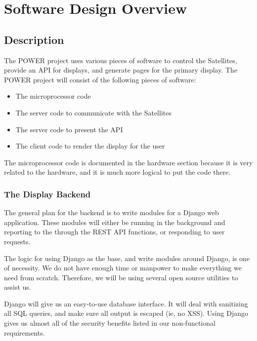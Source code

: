 
\chapter{Software Design Overview}

\section{Description}

The POWER project uses various pieces of software to control the Satellites, provide an API for displays, and generate pages for the primary display. The POWER project will consist of the following pieces of software:
\begin{itemize}
 \item The microprocessor code
 \item The server code to communicate with the Satellites
 \item The server code to present the API
 \item The client code to render the display for the user
\end{itemize}

The microprocessor code is documented in the hardware section because it is very related to the hardware, and it is much more logical to put the  code there.

\subsection{The Display Backend}

The general plan for the backend is to write modules for a Django web application. These modules will either be running in the background and reporting to the through the REST API functions, or responding to user requests.

The logic for using Django as the base, and write modules around Django, is one of necessity. We do not have enough time or manpower to make everything we need from scratch. Therefore, we will be using several open source utilities to assist us. 

Django will give us an easy-to-use database interface. It will deal with sanitizing all SQL queries, and make sure all output is escaped (ie, no XSS). Using Django gives us almost all of the security benefits listed in our non-functional requirements.

